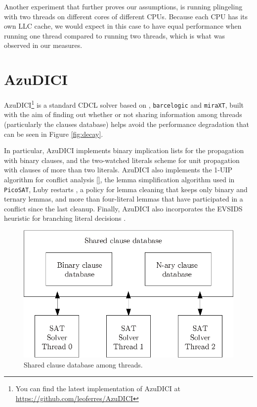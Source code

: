 \documentclass{llncs}
\begin{document}
Another experiment that further proves our assumptions, is running
plingeling with two threads on different cores of different
CPUs. Because each CPU has its own LLC cache, we would expect in this
case to have equal performance when running one thread compared to
running two threads, which is what was observed in our measures.

\section{AzuDICI}
\label{sec:azudici}

AzuDICI\footnote{You can find the latest implementation of AzuDICI at
  \url{https://github.com/leoferres/AzuDICI}} is a standard CDCL
solver based on \pling, {\tt barcelogic} and {\tt miraXT}, built with
the aim of finding out whether or not sharing information among
threads (particularly the clauses database) helps avoid the
performance degradation that can be seen in Figure \ref{fig:decay}.

In particular, AzuDICI implements binary implication lists for the
propagation with binary clauses, and the two-watched literals scheme
for unit propagation \cite{} with clauses of more than two
literals. AzuDICI also implements the 1-UIP algorithm for conflict
analysis \ref{}, the lemma simplification algorithm used in {\tt
  PicoSAT}, Luby restarts \cite{}, a policy for lemma cleaning that
keeps only binary and ternary lemmas, and more than four-literal
lemmas that have participated in a conflict since the last
cleanup. Finally, AzuDICI also incorporates the EVSIDS heuristic for
branching literal decisions \cite{}.

\begin{figure}[tp]
  \centering
  \includegraphics[scale=0.7]{AzuDICI_database}
  \caption{Shared clause database among threads.}
  \label{fig:azu database}
\end{figure}
\end{document}
